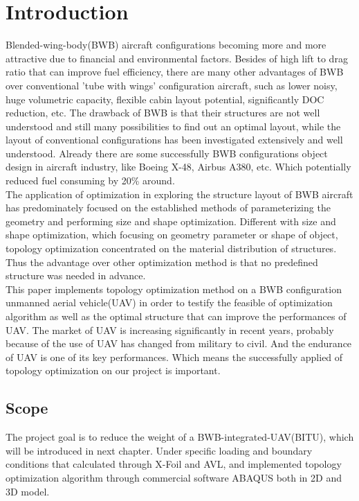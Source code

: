 \chapter{Introduction}

Blended-wing-body(BWB) aircraft configurations becoming more and more attractive due to financial and environmental factors. Besides of high lift to drag ratio that can improve fuel efficiency, there are many other advantages of BWB over conventional 'tube with wings' configuration aircraft, such as lower noisy, huge volumetric capacity, flexible cabin layout potential, significantly DOC reduction, etc. The drawback of BWB is that their structures are not well understood and still many possibilities to find out an optimal layout, while the layout of conventional configurations has been investigated extensively and well understood. Already there are some successfully BWB configurations object design in aircraft industry, like Boeing X-48, Airbus A380, etc. Which potentially reduced fuel consuming by 20\% around. \\
The application of optimization in exploring the structure layout of BWB aircraft has predominately focused on the established methods of parameterizing the geometry and performing size and shape optimization. Different with size and shape optimization, which focusing on geometry parameter or shape of object, topology optimization concentrated on the material distribution of structures. Thus the advantage over other optimization method is that no predefined structure was needed in advance.\\
This paper implements topology optimization method on a BWB configuration unmanned aerial vehicle(UAV) in order to testify the feasible of optimization algorithm as well as the optimal structure that can improve the performances of UAV. The market of UAV is increasing significantly in recent years, probably because of the use of UAV has changed from military to civil. And the endurance of UAV is one of its key performances. Which means the successfully applied of topology optimization on our project is important.



\section{Scope}

The project goal is to reduce the weight of a BWB-integrated-UAV(BITU), which will be introduced in next chapter. Under specific loading and boundary conditions that calculated through X-Foil and AVL, and implemented topology optimization algorithm through commercial software ABAQUS both in 2D and 3D model.

